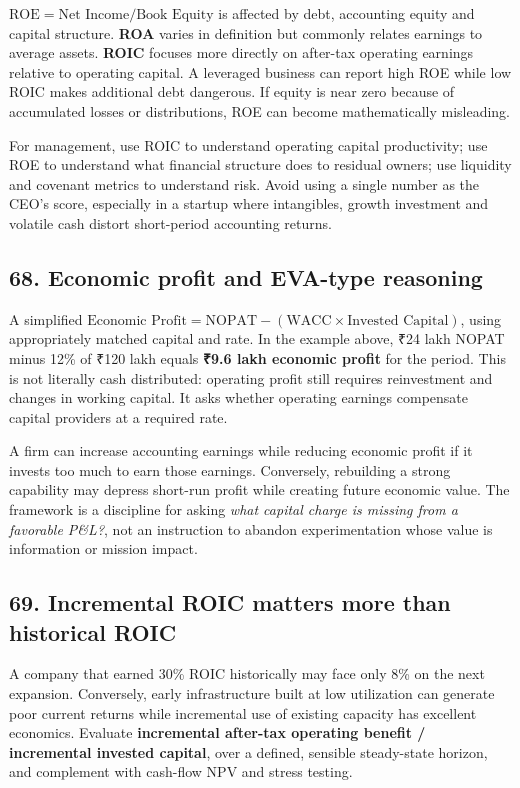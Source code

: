 $\mathrm{ROE} = \text{Net Income} / \text{Book Equity}$ is affected by debt, accounting equity and capital structure. \textbf{ROA} varies in definition but commonly relates earnings to average assets. \textbf{ROIC} focuses more directly on after-tax operating earnings relative to operating capital. A leveraged business can report high ROE while low ROIC makes additional debt dangerous. If equity is near zero because of accumulated losses or distributions, ROE can become mathematically misleading.

For management, use ROIC to understand operating capital productivity; use ROE to understand what financial structure does to residual owners; use liquidity and covenant metrics to understand risk. Avoid using a single number as the CEO's score, especially in a startup where intangibles, growth investment and volatile cash distort short-period accounting returns.

\subsection{68. Economic profit and EVA-type reasoning}


A simplified $\text{Economic Profit} = \mathrm{NOPAT} - (\mathrm{WACC} \times \text{Invested Capital})$, using appropriately matched capital and rate. In the example above, ₹24 lakh NOPAT minus 12\% of ₹120 lakh equals \textbf{₹9.6 lakh economic profit} for the period. This is not literally cash distributed: operating profit still requires reinvestment and changes in working capital. It asks whether operating earnings compensate capital providers at a required rate.

A firm can increase accounting earnings while reducing economic profit if it invests too much to earn those earnings. Conversely, rebuilding a strong capability may depress short-run profit while creating future economic value. The framework is a discipline for asking \textit{what capital charge is missing from a favorable P\&L?}, not an instruction to abandon experimentation whose value is information or mission impact.

\subsection{69. Incremental ROIC matters more than historical ROIC}


A company that earned 30\% ROIC historically may face only 8\% on the next expansion. Conversely, early infrastructure built at low utilization can generate poor current returns while incremental use of existing capacity has excellent economics. Evaluate \textbf{incremental after-tax operating benefit / incremental invested capital}, over a defined, sensible steady-state horizon, and complement with cash-flow NPV and stress testing.

